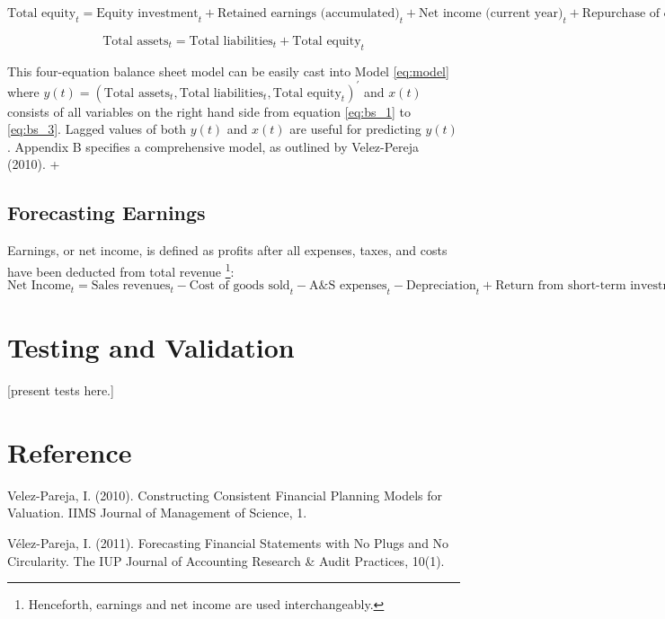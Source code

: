\documentclass[12pt]{article}
\numberwithin{equation}{section}
\begin{document}
\begin{dmath}
	\label{eq:bs_3}
	\text{Total equity}_{t} = \text{Equity investment}_{t} + \text{Retained earnings (accumulated)}_{t} + \text{Net income (current year)}_{t} + \text{Repurchase of equity}_{t}
\end{dmath}

\begin{dmath}
	\text{Total assets}_{t} = \text{Total liabilities}_{t} + \text{Total equity}_{t}
\end{dmath}

This four-equation balance sheet model can be easily cast into Model \ref{eq:model} where  $y(t) = (\text{Total assets}_{t},\text{Total liabilities}_{t},\text{Total equity}_{t})^{'}$ and $x(t)$ consists of all variables on the right hand side from equation \ref{eq:bs_1} to \ref{eq:bs_3}. Lagged values of both $y(t)$ and $x(t)$ are useful for predicting $y(t)$. Appendix B specifies a comprehensive model, as outlined by Velez-Pereja (2010).
+

\subsection*{Forecasting Earnings}
Earnings, or net income, is defined as profits after all expenses, taxes, and costs have been deducted from total revenue \footnote{Henceforth, earnings and net income are used interchangeably.}:
\begin{dmath}
	\text{Net Income}_{t} = \text{Sales revenues}_{t} - \text{Cost of goods sold}_{t} - \text{A\&S expenses}_{t}  - \text{Depreciation}_{t} + \text{Return from short-term investments}_{t} - \text{Interest payments}_{t} - \text{Income Taxes}_{t}
\end{dmath}
\section{Testing and Validation}

[present tests here.]

\section*{Reference}

Velez-Pareja, I. (2010). Constructing Consistent Financial Planning Models for Valuation. IIMS Journal of Management of Science, 1.

Vélez-Pareja, I. (2011). Forecasting Financial Statements with No Plugs and No Circularity. The IUP Journal of Accounting Research \& Audit Practices, 10(1).
\end{document}
